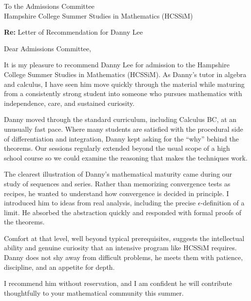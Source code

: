 To the Admissions Committee \\
Hampshire College Summer Studies in Mathematics (HCSSiM)

\vspace{0.75em}

\textbf{Re:} Letter of Recommendation for Danny Lee

\vspace{1em}

Dear Admissions Committee,

It is my pleasure to recommend Danny Lee for admission to the Hampshire College Summer Studies in Mathematics (HCSSiM). 
As Danny's tutor in algebra and calculus, I have seen him move quickly through the material while maturing 
from a consistently strong student into someone who pursues mathematics with independence, care, and sustained curiosity.

Danny moved through the standard curriculum, including Calculus BC, at an unusually fast pace. 
Where many students are satisfied with the procedural side of differentiation and integration, 
Danny kept asking for the ``why'' behind the theorems. Our sessions regularly extended beyond 
the usual scope of a high school course so we could examine the reasoning that makes the techniques work.

The clearest illustration of Danny's mathematical maturity came during our study of sequences and series. 
Rather than memorizing convergence tests as recipes, he wanted to understand how convergence is decided 
in principle. I introduced him to ideas from real analysis, including the precise $\epsilon$-definition 
of a limit. He absorbed the abstraction quickly and responded with formal proofs of the theorems.

Comfort at that level, well beyond typical prerequisites, suggests the intellectual ability and genuine 
curiosity that an intensive program like HCSSiM requires. Danny does not shy away from difficult problems, 
he meets them with patience, discipline, and an appetite for depth.

I recommend him without reservation, and I am confident he will contribute thoughtfully to your 
mathematical community this summer.